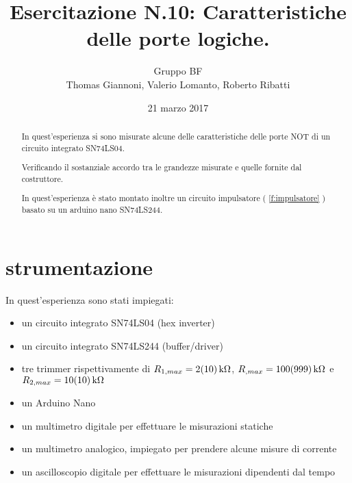 \documentclass[a4paper,11pt]{article}
\author{Gruppo BF \\ Thomas Giannoni, Valerio Lomanto, Roberto Ribatti}
\title{Esercitazione N.10: Caratteristiche delle porte logiche.}
\date{21 marzo 2017}
\begin{document}
\maketitle
\begin{abstract}
	In quest'esperienza si sono misurate alcune delle caratteristiche delle porte NOT di un circuito integrato SN74LS04.

	Verificando il sostanziale accordo tra le grandezze misurate e quelle fornite dal costruttore.

	In quest'esperienza è stato montato inoltre un circuito impulsatore (\figurename{ \ref{f:impulsatore}} ) basato su  un arduino nano SN74LS244.

\end{abstract}
	\section{strumentazione}
		In quest'esperienza sono stati impiegati:
		\begin{itemize}
			\item un circuito integrato SN74LS04 (hex inverter)
			\item un circuito integrato SN74LS244 (buffer/driver)
			\item tre trimmer rispettivamente di $R_{1,max} = \SI{2 \pm 10}{\kilo \ohm}$, $R_{,max} = \SI{100 \pm 999}{\kilo\ohm}$ e $R_{2,max} = \SI{10 \pm 10}{\kilo\ohm}$
			\item un Arduino Nano
			\item un multimetro digitale per effettuare le misurazioni statiche
			\item un multimetro analogico, impiegato per prendere alcune misure di corrente
			\item un ascilloscopio digitale per effettuare le misurazioni dipendenti dal tempo
		\end{itemize}
	
\end{document}
